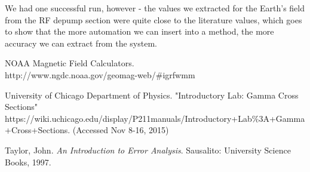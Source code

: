 \documentclass{article}
\begin{document}
  \hspace{.25cm}

  We had one successful run, however - the values we extracted for the Earth's field from the RF depump section were quite close to the literature values, which goes to show that the more automation we can insert into a method, the more accuracy we can extract from the system.
\begin{thebibliography}{10}
    NOAA Magnetic Field Calculators. \\ http://www.ngdc.noaa.gov/geomag-web/\#igrfwmm

  	University of Chicago Department of Physics. "Introductory Lab: Gamma Cross Sections"\\
  	https://wiki.uchicago.edu/display/P211manuals/Introductory+Lab\%3A+Gamma+Cross+Sections. (Accessed Nov 8-16, 2015)

  	Taylor, John. \emph{An Introduction to Error Analysis}. Sausalito: University Science Books, 1997.
\end{thebibliography}
\end{document}
